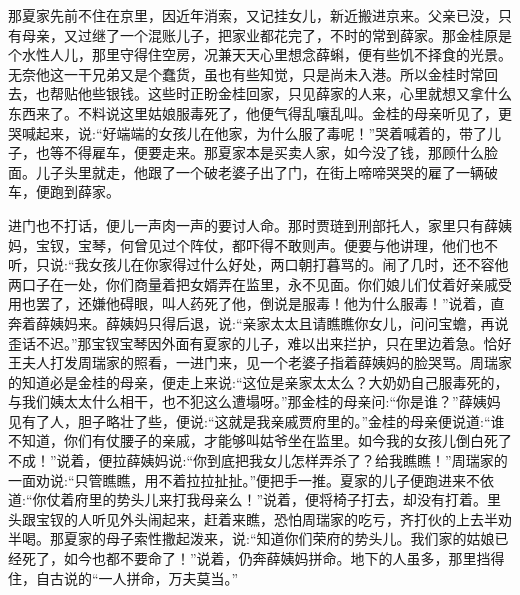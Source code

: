 \begin{parag}
    那夏家先前不住在京里，因近年消索，又记挂女儿，新近搬进京来。父亲已没，只有母亲，又过继了一个混账儿子，把家业都花完了，不时的常到薛家。那金桂原是个水性人儿，那里守得住空房，况兼天天心里想念薛蝌，便有些饥不择食的光景。无奈他这一干兄弟又是个蠢货，虽也有些知觉，只是尚未入港。所以金桂时常回去，也帮贴他些银钱。这些时正盼金桂回家，只见薛家的人来，心里就想又拿什么东西来了。不料说这里姑娘服毒死了，他便气得乱嚷乱叫。金桂的母亲听见了，更哭喊起来，说:“好端端的女孩儿在他家，为什么服了毒呢！”哭着喊着的，带了儿子，也等不得雇车，便要走来。那夏家本是买卖人家，如今没了钱，那顾什么脸面。儿子头里就走，他跟了一个破老婆子出了门，在街上啼啼哭哭的雇了一辆破车，便跑到薛家。
\end{parag}


\begin{parag}
    进门也不打话，便儿一声肉一声的要讨人命。那时贾琏到刑部托人，家里只有薛姨妈，宝钗，宝琴，何曾见过个阵仗，都吓得不敢则声。便要与他讲理，他们也不听，只说:“我女孩儿在你家得过什么好处，两口朝打暮骂的。闹了几时，还不容他两口子在一处，你们商量着把女婿弄在监里，永不见面。你们娘儿们仗着好亲戚受用也罢了，还嫌他碍眼，叫人药死了他，倒说是服毒！他为什么服毒！”说着，直奔着薛姨妈来。薛姨妈只得后退，说:“亲家太太且请瞧瞧你女儿，问问宝蟾，再说歪话不迟。”那宝钗宝琴因外面有夏家的儿子，难以出来拦护，只在里边着急。恰好王夫人打发周瑞家的照看，一进门来，见一个老婆子指着薛姨妈的脸哭骂。周瑞家的知道必是金桂的母亲，便走上来说:“这位是亲家太太么？大奶奶自己服毒死的，与我们姨太太什么相干，也不犯这么遭塌呀。”那金桂的母亲问:“你是谁？”薛姨妈见有了人，胆子略壮了些，便说:“这就是我亲戚贾府里的。”金桂的母亲便说道:“谁不知道，你们有仗腰子的亲戚，才能够叫姑爷坐在监里。如今我的女孩儿倒白死了不成！”说着，便拉薛姨妈说:“你到底把我女儿怎样弄杀了？给我瞧瞧！”周瑞家的一面劝说:“只管瞧瞧，用不着拉拉扯扯。”便把手一推。夏家的儿子便跑进来不依道:“你仗着府里的势头儿来打我母亲么！”说着，便将椅子打去，却没有打着。里头跟宝钗的人听见外头闹起来，赶着来瞧，恐怕周瑞家的吃亏，齐打伙的上去半劝半喝。那夏家的母子索性撒起泼来，说:“知道你们荣府的势头儿。我们家的姑娘已经死了，如今也都不要命了！”说着，仍奔薛姨妈拼命。地下的人虽多，那里挡得住，自古说的“一人拼命，万夫莫当。”
\end{parag}


